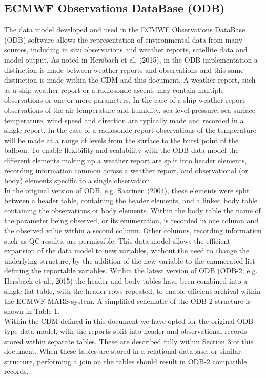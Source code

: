 \documentclass[a4paper,11pt]{article}
\begin{document}
\subsection{ECMWF Observations DataBase (ODB)}

The data model developed and used in the ECMWF Observations DataBase (ODB) software allows the representation of environmental data from many sources, including in situ observations and weather reports, satellite data and model output. As noted in Hersbach et al. (2015), in the ODB implementation a distinction is made between weather reports and observations and this same distinction is made within the CDM and this document.  A weather report, such as a ship weather report or a radiosonde ascent, may contain multiple observations or one or more parameters. In the case of a ship weather report observations of the air temperature and humidity, sea level pressure, sea surface temperature, wind speed and direction are typically made and recorded in a single report. In the case of a radiosonde report observations of the temperature will be made at a range of levels from the surface to the burst point of the balloon. To enable flexibility and scalability with the ODB data model the different elements making up a weather report are split into header elements, recording information common across a weather report, and observational (or body) elements specific to a single observation.\\

In the original version of ODB, e.g. Saarinen (2004), these elements were split between a header table, containing the header elements, and a linked body table containing the observations or body elements. Within the body table the name of the parameter being observed, or its enumeration, is recorded in one column and the observed value within a second column.  Other columns, recording information such as QC results, are permissible. This data model allows the efficient expansion of the data model to new variables, without the need to change the underlying structure, by the addition of the new variable to the enumerated list defining the reportable variables. Within the latest version of ODB (ODB-2; e.g. Hersbach et al., 2015) the header and body tables have been combined into a single flat table, with the header rows repeated, to enable efficient archival within the ECMWF MARS system. A simplified schematic of the ODB-2 structure is shown in Table 1.\\

Within the CDM defined in this document we have opted for the original ODB type data model, with the reports split into header and observational records stored within separate tables. These are described fully within Section 3 of this document. When these tables are stored in a relational database, or similar structure, performing a join on the tables should result in ODB-2 compatible records.\\
\end{document}
